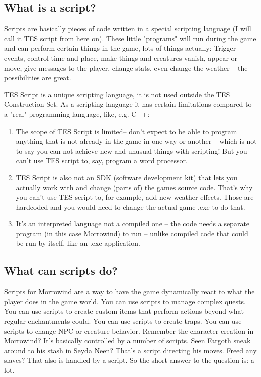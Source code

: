 \documentclass[
]{article}
\begin{document}
\hypertarget{what-is-a-script}{%
\subsection{What is a script?}\label{what-is-a-script}}

Scripts are basically pieces of code written in a special scripting
language (I will call it TES script from here on). These little
"programs" will run during the game and can perform certain things in
the game, lots of things actually: Trigger events, control time and
place, make things and creatures vanish, appear or move, give messages
to the player, change stats, even change the weather -- the
possibilities are great.

TES Script is a unique scripting language, it is not used outside the
TES Construction Set. As a scripting language it has certain limitations
compared to a "real" programming language, like, e.g. C++:

\begin{enumerate}
\def\labelenumi{\arabic{enumi}.}
\item
  The scope of TES Script is limited-- don't expect to be able to
  program anything that is not already in the game in one way or another
  -- which is not to say you can not achieve new and unusual things with
  scripting! But you can't use TES script to, say, program a word
  processor.
\item
  TES Script is also not an SDK (software development kit) that lets you
  actually work with and change (parts of) the games source code. That's
  why you can't use TES script to, for example, add new weather-effects.
  Those are hardcoded and you would need to change the actual game .exe
  to do that.
\item
  It's an interpreted language not a compiled one -- the code needs a
  separate program (in this case Morrowind) to run -- unlike compiled
  code that could be run by itself, like an .exe application.
\end{enumerate}

\hypertarget{what-can-scripts-do}{%
\subsection{What can scripts do?}\label{what-can-scripts-do}}

Scripts for Morrowind are a way to have the game dynamically react to
what the player does in the game world. You can use scripts to manage
complex quests. You can use scripts to create custom items that perform
actions beyond what regular enchantments could. You can use scripts to
create traps. You can use scripts to change NPC or creature behavior.
Remember the character creation in Morrowind? It's basically controlled
by a number of scripts. Seen Fargoth sneak around to his stash in Seyda
Neen? That's a script directing his moves. Freed any slaves? That also
is handled by a script. So the short answer to the question is: a lot.
\end{document}
